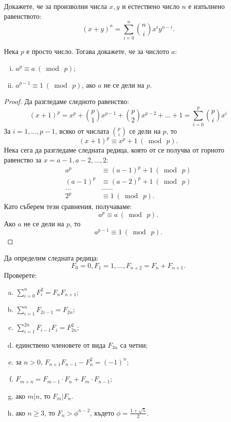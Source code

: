 \begin{problem}
  Докажете, че за произволни числа $x,y$ и естествено число $n$ е изпълнено равенството:
  \[(x+y)^n = \sum^{n}_{i=0}\binom{n}{i}x^iy^{n-i}.\]
\end{problem}
\begin{problem}
  Нека $p$ е просто число. Тогава докажете, че за числото $a$:
  \begin{enumerate}[i)]
  \item
    $a^p \equiv a\ (\bmod\ p)$;
  \item 
    $a^{p-1} \equiv 1\ (\bmod\ p)$, ако $a$ не се дели на $p$.
  \end{enumerate}
\end{problem}
\begin{proof}
  Да разгледаме следното равенство:
  \[(x+1)^p = x^p + \binom{p}{1}x^{p-1} + \binom{p}{2}x^{p-2} + \dots + 1 = \sum^{p}_{i=0}\binom{p}{i}x^i\]
  За $i = 1,\dots,p-1$, всяко от числата $\binom{p}{i}$ се дели на $p$, то 
  \[(x+1)^p \equiv x^p + 1\ (\bmod\ p).\]
  Нека сега да разгледаме следната редица, която от се получва от горното равенство за $x = a-1,a-2,\dots,2$:
  \begin{align*}
    a^p & \equiv (a-1)^p+1\ (\bmod\ p)\\
    (a-1)^p & \equiv (a-2)^p+1\ (\bmod\ p)\\
    \dots & \dots\dots\\
    2^p & \equiv 1\ (\bmod\ p).
  \end{align*}
  Като съберем тези сравнения, получаваме:
  \[a^p \equiv a\ (\bmod\ p).\]
  Ако $a$ не се дели на $p$, то
  \[a^{p-1} \equiv 1\ (\bmod\ p).\]
\end{proof}

\begin{problem}
  Да определим следната редица:
  \[F_0 = 0,F_1 = 1,\dots,F_{n+2} = F_{n} + F_{n+1}.\]
  Проверете:
  \begin{enumerate}[a)]
  \item
    $\sum^n_{i=0} F^2_i = F_{n}F_{n+1}$;
  \item
    $\sum^n_{i=1} F_{2i-1} = F_{2n}$;
  \item
    $\sum^{2n}_{i=1}F_{i-1}F_{i} = F^2_{2n}$;
  \item
    единствено членовете от вида $F_{3n}$ са четни;
  \item
    за $n > 0$, $F_{n+1}F_{n-1} - F^2_n = (-1)^n$;
  \item
    $F_{m+n} = F_{m-1}\cdot F_{n} + F_m \cdot F_{n-1}$;
  \item
    ако $m\vert n$, то $F_m \vert F_n$.
  \item
    ако $n\geq 3$, то $F_n > \phi^{n-2}$,
    където $\phi = \frac{1+\sqrt{5}}{2}$.
  \end{enumerate}
\end{problem}

